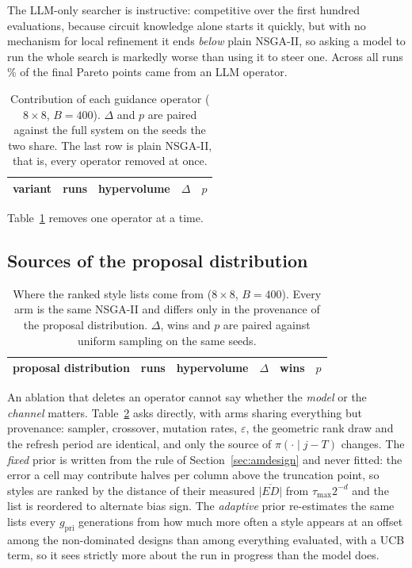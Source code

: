 \documentclass[acmsmall,review,anonymous]{acmart}
\begin{document}
The LLM-only searcher is instructive: competitive over the first hundred
evaluations, because circuit knowledge alone starts it quickly, but with no
mechanism for local refinement it ends \emph{below} plain NSGA-II, so asking a
model to run the whole search is markedly worse than using it to steer one.
Across all runs \LLMfrontShare\% of the final Pareto points came from an LLM
operator.

\begin{table}[t]
\caption{Contribution of each guidance operator ($8\times8$, $B=400$).
$\Delta$ and $p$ are paired against the full system on the seeds the two
share.  The last row is plain NSGA-II, that is, every operator removed at
once.}
\label{tab:ablation}
\centering\small
\setlength{\tabcolsep}{5pt}
\begin{tabular}{lcccc}
\toprule
variant & runs & hypervolume & $\Delta$ & $p$\\
\midrule

\bottomrule
\end{tabular}
\end{table}

Table~\ref{tab:ablation} removes one operator at a time.  \AblationText

\subsection{Sources of the proposal distribution}
\label{sec:prior}

\begin{table}[t]
\caption{Where the ranked style lists come from ($8\times8$, $B=400$).  Every
arm is the same NSGA-II and differs only in the provenance of the proposal
distribution.  $\Delta$, wins and $p$ are paired against uniform sampling on
the same seeds.}
\label{tab:prior}
\centering\footnotesize
\setlength{\tabcolsep}{3pt}
\begin{tabular}{lccccc}
\toprule
proposal distribution & runs & hypervolume & $\Delta$ & wins & $p$\\
\midrule

\bottomrule
\end{tabular}
\end{table}

An ablation that deletes an operator cannot say whether the \emph{model} or the
\emph{channel} matters.  Table~\ref{tab:prior} asks directly, with arms sharing
everything but provenance: sampler, crossover, mutation rates, $\varepsilon$,
the geometric rank draw and the refresh period are identical, and only the
source of $\pi(\cdot\mid j-T)$ changes.  The \emph{fixed} prior is written from
the rule of Section~\ref{sec:amdesign} and never fitted: the error a cell may
contribute halves per column above the truncation point, so styles are ranked
by the distance of their measured $\overline{|ED|}$ from $\tau_{\max}2^{-d}$
and the list is reordered to alternate bias sign.  The \emph{adaptive} prior
re-estimates the same lists every $g_{\mathrm{pri}}$ generations from how much
more often a style appears at an offset among the non-dominated designs than
among everything evaluated, with a UCB term, so it sees strictly more about the
run in progress than the model does.
\end{document}
